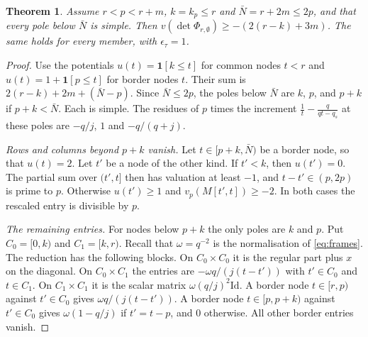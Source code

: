 \documentclass[11pt]{amsart}
\newtheorem{theorem}{Theorem}[section]
\theoremstyle{definition}
\theoremstyle{remark}
\numberwithin{equation}{section}
\newcommand{\Id}{\mathrm{Id}}
\begin{document}
\begin{theorem}\label{thm:lp2}
Assume $r<p<r+m$, $k=k_p\le r$ and $\bar N=r+2m\le2p$, and that every pole below $\bar N$ is simple. Then
$v(\det\Phi_{r,\emptyset})\ge-(2(r-k)+3m)$. The same holds for every member, with $\epsilon_\tau=1$.
\end{theorem}
\begin{proof}
Use the potentials $u(t)=\mathbf 1[k\le t]$ for common nodes $t<r$ and $u(t)=1+\mathbf 1[p\le t]$ for border nodes $t$.
Their sum is $2(r-k)+2m+(\bar N-p)$. Since $\bar N\le2p$, the poles below $\bar N$ are $k$, $p$, and $p+k$ if $p+k<\bar N$. Each is
simple. The residues of $p$ times the increment $\frac1t-\frac q{qt-q_s}$ at these poles are $-q/j$, $1$ and $-q/(q+j)$.

\emph{Rows and columns beyond $p+k$ vanish.} Let $t\in[p+k,\bar N)$ be a border node, so that $u(t)=2$. Let $t'$ be a node of
the other kind. If $t'<k$, then $u(t')=0$. The partial sum over $(t',t]$ then has valuation at least $-1$, and
$t-t'\in(p,2p)$ is prime to $p$. Otherwise $u(t')\ge1$ and $v_p(M[t',t])\ge-2$. In both cases the rescaled entry is
divisible by $p$.

\emph{The remaining entries.} For nodes below $p+k$ the only poles are $k$ and $p$. Put $C_0=[0,k)$ and $C_1=[k,r)$.
Recall that $\omega=q^{-2}$ is the normalisation of \eqref{eq:frames}. The reduction has the following blocks. On
$C_0\times C_0$ it is the regular part plus $x$ on the diagonal. On $C_0\times C_1$ the entries are
$-\omega q/(j(t-t'))$ with $t'\in C_0$ and $t\in C_1$. On $C_1\times C_1$ it is the scalar matrix $\omega(q/j)^2\Id$. A
border node $t\in[r,p)$ against $t'\in C_0$ gives $\omega q/(j(t-t'))$. A border node $t\in[p,p+k)$ against $t'\in C_0$
gives $\omega(1-q/j)$ if $t'=t-p$, and $0$ otherwise. All other border entries vanish.


\end{proof}
\end{document}
